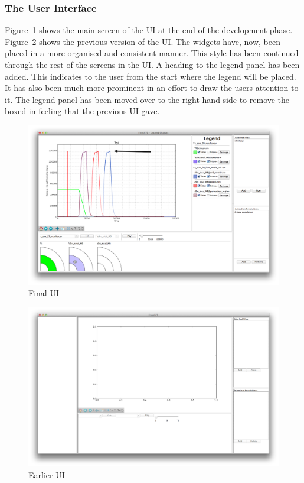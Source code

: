 \subsubsection{The User Interface}

Figure~\ref{fig:main_ui} shows the main screen of the \ac{UI} at the end of the development phase.  Figure~\ref{fig:old_ui} shows the previous version of the \ac{UI}.  The widgets have, now, been placed in a more organised and consistent manner.  This style has been continued through the rest of the screens in the \ac{UI}.  A heading to the legend panel has been added.  This indicates to the user from the start where the legend will be placed.  It has also been much more prominent in an effort to draw the users attention to it.  The legend panel has been moved over to the right hand side to remove the boxed in feeling that the previous \ac{UI} gave.

\begin{figure}[h!]
    \centering
    \includegraphics[width=\textwidth]{images/main_ui.png}
    \caption{Final \ac{UI}}
    \label{fig:main_ui}
\end{figure}

\begin{figure}[h!]
    \centering
    \includegraphics[width=\textwidth]{images/old_ui.png}
    \caption{Earlier \ac{UI}}
    \label{fig:old_ui}
\end{figure}

